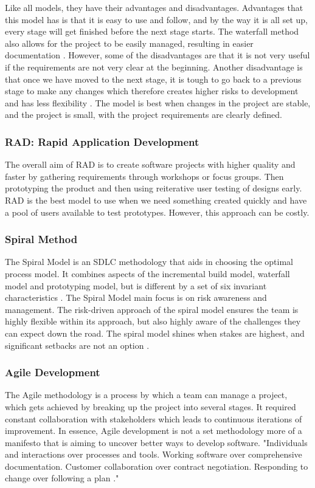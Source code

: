 \documentclass[a4paper,10pt]{article}
\begin{document}
Like all models, they have their advantages and disadvantages. Advantages that this model has is that it is easy to use and follow, and by the way it is all set up, every stage will get finished before the next stage starts. The waterfall method also allows for the project to be easily managed, resulting in easier documentation \cite{cscm01slidesl5}. However, some of the disadvantages are that it is not very useful if the requirements are not very clear at the beginning. Another disadvantage is that once we have moved to the next stage, it is tough to go back to a previous stage to make any changes which therefore creates higher risks to development and has less flexibility \cite{cscm01slidesl5}. The model is best when changes in the project are stable, and the project is small, with the project requirements are clearly defined.

\subsubsection{RAD: Rapid Application Development}
The overall aim of RAD is to create software projects with higher quality and faster by gathering requirements through workshops or focus groups. Then prototyping the product and then using reiterative user testing of designs early. RAD is the best model to use when we need something created quickly and have a pool of users available to test prototypes. However, this approach can be costly\cite{cscm01slides}. 

\subsubsection{Spiral Method}
The Spiral Model is an SDLC methodology that aids in choosing the optimal process model. It combines aspects of the incremental build model, waterfall model and prototyping model, but is different by a set of six invariant characteristics \cite{spiralmodel}. The Spiral Model main focus is on risk awareness and management. The risk-driven approach of the spiral model ensures the team is highly flexible within its approach, but also highly aware of the challenges they can expect down the road. The spiral model shines when stakes are highest, and significant setbacks are not an option \cite{spiralmodel}.


\subsubsection{Agile Development}
The Agile methodology is a process by which a team can manage a project, which gets achieved by breaking up the project into several stages. It required constant collaboration with stakeholders which leads to continuous iterations of improvement. In essence, Agile development is not a set methodology more of a manifesto that is aiming to uncover better ways to develop software. "Individuals and interactions over processes and tools. Working software over comprehensive documentation. Customer collaboration over contract negotiation. Responding to change over following a plan \cite{agilemanifesto}."
\end{document}
